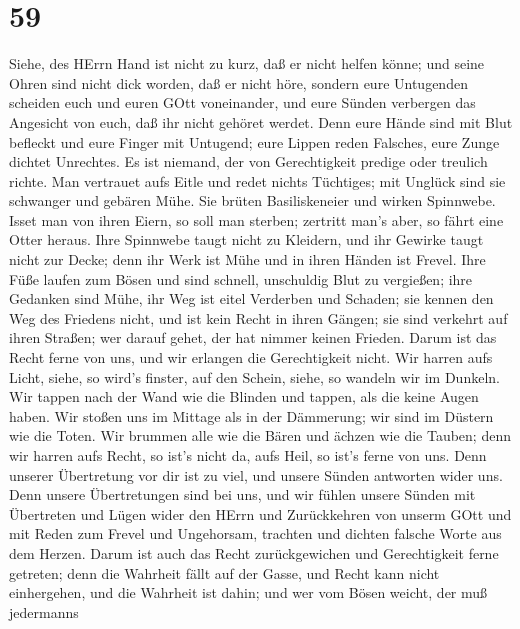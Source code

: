 \hypertarget{section-58}{%
\section{59}\label{section-58}}

 Siehe, des HErrn Hand ist nicht zu kurz, daß er nicht
helfen könne; und seine Ohren sind nicht dick worden, daß er nicht höre,
 sondern eure Untugenden scheiden euch und euren GOtt
voneinander, und eure Sünden verbergen das Angesicht von euch, daß ihr
nicht gehöret werdet.  Denn eure Hände sind mit Blut
befleckt und eure Finger mit Untugend; eure Lippen reden Falsches, eure
Zunge dichtet Unrechtes.  Es ist niemand, der von
Gerechtigkeit predige oder treulich richte. Man vertrauet aufs Eitle und
redet nichts Tüchtiges; mit Unglück sind sie schwanger und gebären Mühe.
 Sie brüten Basiliskeneier und wirken Spinnwebe. Isset man
von ihren Eiern, so soll man sterben; zertritt man's aber, so fährt eine
Otter heraus.  Ihre Spinnwebe taugt nicht zu Kleidern, und
ihr Gewirke taugt nicht zur Decke; denn ihr Werk ist Mühe und in ihren
Händen ist Frevel.  Ihre Füße laufen zum Bösen und sind
schnell, unschuldig Blut zu vergießen; ihre Gedanken sind Mühe, ihr Weg
ist eitel Verderben und Schaden;  sie kennen den Weg des
Friedens nicht, und ist kein Recht in ihren Gängen; sie sind verkehrt
auf ihren Straßen; wer darauf gehet, der hat nimmer keinen Frieden.
 Darum ist das Recht ferne von uns, und wir erlangen die
Gerechtigkeit nicht. Wir harren aufs Licht, siehe, so wird's finster,
auf den Schein, siehe, so wandeln wir im Dunkeln.  Wir
tappen nach der Wand wie die Blinden und tappen, als die keine Augen
haben. Wir stoßen uns im Mittage als in der Dämmerung; wir sind im
Düstern wie die Toten.  Wir brummen alle wie die Bären und
ächzen wie die Tauben; denn wir harren aufs Recht, so ist's nicht da,
aufs Heil, so ist's ferne von uns.  Denn unserer
Übertretung vor dir ist zu viel, und unsere Sünden antworten wider uns.
Denn unsere Übertretungen sind bei uns, und wir fühlen unsere Sünden
 mit Übertreten und Lügen wider den HErrn und Zurückkehren
von unserm GOtt und mit Reden zum Frevel und Ungehorsam, trachten und
dichten falsche Worte aus dem Herzen.  Darum ist auch das
Recht zurückgewichen und Gerechtigkeit ferne getreten; denn die Wahrheit
fällt auf der Gasse, und Recht kann nicht einhergehen,  und
die Wahrheit ist dahin; und wer vom Bösen weicht, der muß jedermanns
